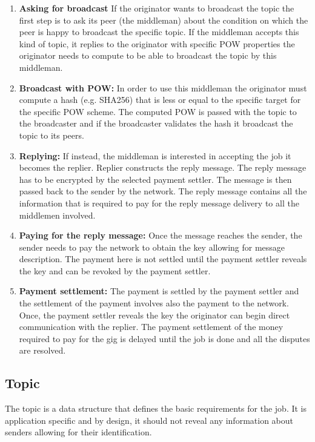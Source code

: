 \documentclass{article}
\begin{document}
\begin{enumerate} 
	\item  \textbf{Asking for broadcast} If the originator wants to broadcast the topic the first step is to ask its peer (the middleman) about the condition on which the peer is happy to broadcast the specific topic. If the middleman accepts this kind of topic, it replies to the originator with specific POW properties the originator needs to compute to be able to broadcast the topic by this middleman.
	\item  \textbf{Broadcast with POW:} In order to use this middleman the originator must compute a hash (e.g. SHA256) that is less or equal to the specific target for the specific POW scheme. The computed POW is passed with the topic to the broadcaster and if the broadcaster validates the hash it broadcast the topic to its peers.
	\item  \textbf{Replying:} If instead, the middleman is interested in accepting the job it becomes the replier. Replier constructs the reply message. The reply message has to be encrypted by the selected payment settler. The message is then passed back to the sender by the network. The reply message contains all the information that is required to pay for the reply message delivery to all the middlemen involved. 
	\item  \textbf{Paying for the reply message:} Once the message reaches the sender, the sender needs to pay the network to obtain the key allowing for message description. The payment here is not settled until the payment settler reveals the key and can be revoked by the payment settler. 
	\item \textbf{Payment settlement:} The payment is settled by the payment settler and the settlement of the payment involves also the payment to the network. Once, the payment settler reveals the key the originator can begin direct communication with the replier. The payment settlement of the money required to pay for the gig is delayed until the job is done and all the disputes are resolved.
\end{enumerate}

\subsection{Topic}

The topic is a data structure that defines the basic requirements for the job. It is application specific and by design, it should not reveal any information about senders allowing for their identification.
\end{document}

